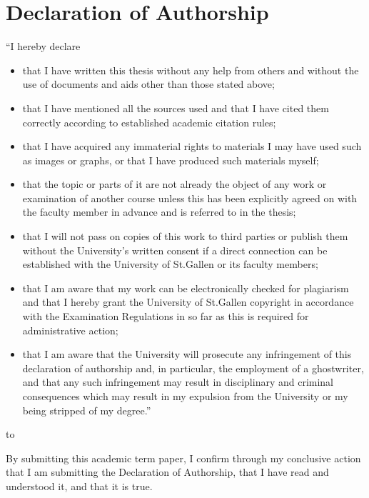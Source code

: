 \section*{Declaration of Authorship}

“I hereby declare

\begin{itemize}
	\item that I have written this thesis without any help from others and without the use of documents and aids other than those stated above;
	\item that  I  have  mentioned  all  the  sources  used  and  that  I  have  cited  them  correctly according to established academic citation rules;
	\item that I have acquired any immaterial rights to materials I may have used such as images or graphs, or that I have produced such materials myself;
	\item that the topic or parts of it are not already the object of any work or examination of another course unless this has been explicitly agreed on with the faculty member in advance and is referred to in the thesis;
	\item that I will not pass on copies of this work to third parties or publish them without the University’s  written  consent  if  a  direct  connection  can  be  established  with  the University of St.Gallen or its faculty members;
	\item that I am aware that my work can be electronically checked for plagiarism and that I hereby grant the University of St.Gallen copyright in accordance with the Examination Regulations in so far as this is required for administrative action;
	\item that I am aware that the University will prosecute any infringement of this declaration of authorship and, in particular, the employment of a ghostwriter, and that any such infringement may result in disciplinary and criminal consequences which may result in my expulsion from the University or my being stripped of my degree.”
\end{itemize}

\newcommand{\textfield}[2]{
  \vbox{
    \hsize=#1\kern2cm\hrule\kern1ex
    \hbox to \hsize{\strut\hfil\footnotesize#2\hfil}
  }
}

\hbox to \hsize{\textfield{4cm}{Date}\hfil\hfil\textfield{7cm}{Signature}}

By submitting this academic term paper, I confirm through my conclusive action that I am submitting the Declaration of Authorship, that I have read and understood it, and that it is true.

\newpage
